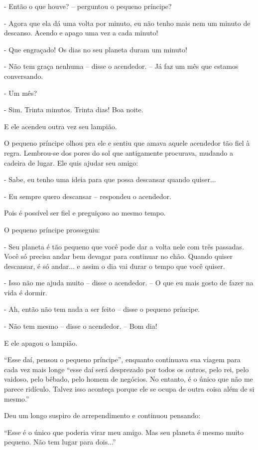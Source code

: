- Então o que houve? -- perguntou o pequeno príncipe?

- Agora que ela dá uma volta por minuto, eu não tenho mais nem um minuto
de descanso. Acendo e apago uma vez a cada minuto!

- Que engraçado! Os dias no seu planeta duram um minuto!

- Não tem graça nenhuma -- disse o acendedor. -- Já faz um mês que
estamos conversando.

- Um mês?

- Sim. Trinta minutos. Trinta dias! Boa noite.

E ele acendeu outra vez seu lampião.

O pequeno príncipe olhou pra ele e sentiu que amava aquele acendedor tão
fiel à regra. Lembrou-se dos pores do sol que antigamente procurava,
mudando a cadeira de lugar. Ele quis ajudar seu amigo:

- Sabe, eu tenho uma ideia para que possa descansar quando quiser...

- Eu sempre quero descansar -- respondeu o acendedor.

Pois é possível ser fiel e preguiçoso ao mesmo tempo.

O pequeno príncipe prosseguiu:

- Seu planeta é tão pequeno que você pode dar a volta nele com três
passadas. Você só precisa andar bem devagar para continuar no chão.
Quando quiser descansar, é só andar... e assim o dia vai durar o tempo
que você quiser.

- Isso não me ajuda muito -- disse o acendedor. -- O que eu mais gosto
de fazer na vida é dormir.

- Ah, então não tem nada a ser feito -- disse o pequeno príncipe.

- Não tem mesmo -- disse o acendedor. -- Bom dia!

E ele apagou o lampião.

``Esse daí, pensou o pequeno príncipe'', enquanto continuava sua viagem
para cada vez mais longe ``esse daí será desprezado por todos os outros,
pelo rei, pelo vaidoso, pelo bêbado, pelo homem de negócios. No entanto,
é o único que não me parece ridículo. Talvez isso aconteça porque ele se
ocupa de outra coisa além de si mesmo.''

Deu um longo suspiro de arrependimento e continuou pensando:

``Esse é o único que poderia virar meu amigo. Mas seu planeta é mesmo
muito pequeno. Não tem lugar para dois...''

